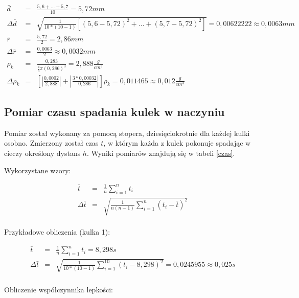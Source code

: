 \documentclass[wide,a4paper,titlepage,12pt]{mwart}
\begin{document}
    \begin{eqnarray*}
      \bar{d} &=& \frac{5,6 + ... + 5,7}{10} = 5,72 mm \\
      \Delta \bar{d} &=& \sqrt{\frac{1}{10*(10-1)} \left[ \left( 5,6 - 5,72\right)^2 + ... + \left( 5,7 - 5,72\right)^2  \right] }  = 0,00622222 \approx 0,0063 mm \\
      \bar{r} &=& \frac{5,72}{2} = 2,86 mm \\
      \Delta \bar{r} &=& \frac{0,0063}{2} \approx 0,0032 mm \\
      \rho_k &=& \frac{0,283}{\frac{4}{3} \pi (0,286)^3} = 2,888 \frac{g}{cm^3} \\
      \Delta \rho_k &=& \left [ \left | \frac{0,0002}{2,888}\right | + \left | \frac{3*0,00032}{0,286}\right |\right] \rho_k = 0,011465 \approx 0,012 \frac{g}{cm^3}
    \end{eqnarray*}
    
    \subsection{Pomiar czasu spadania kulek w naczyniu}
    
  
    Pomiar został wykonany za pomocą stopera, dziesięciokrotnie dla każdej kulki osobno. Zmierzony został czas $t$, w którym każda z kulek pokonuje spadając w cieczy określony dystans $h$. Wyniki pomiarów znajdują się w tabeli \ref{czas}.
    \newline

    Wykorzystane wzory:
    
    \begin{eqnarray*}
      \bar{t} &=& \frac{1}{n} \sum_{i=1}^{n} t_i \\
      \Delta \bar{t} &=& \sqrt{\frac{1}{n(n-1)} \sum_{i=1}^{n} (t_i - \bar{t})^2} \\
    \end{eqnarray*}
    
    Przykładowe obliczenia (kulka 1):
    
    \begin{eqnarray*}
      \bar{t} &=& \frac{1}{n} \sum_{i=1}^{n} t_i = 8,298 s\\
      \Delta \bar{t} &=& \sqrt{\frac{1}{10*(10-1)} \sum_{i=1}^{10} (t_i - 8,298)^2} = 0,0245955 \approx 0,025 s \\
    \end{eqnarray*}
    
    Obliczenie współczynnika lepkości:
    
\end{document}
